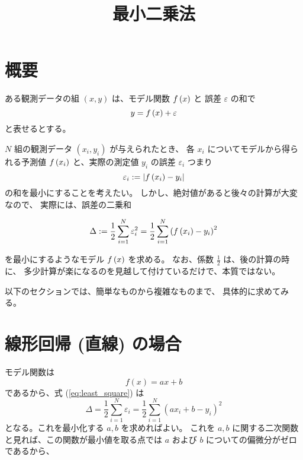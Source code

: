 \documentclass[12pt]{jsarticle}
\title{最小二乗法}
\def\error{\varepsilon}
\def\sumdata{\sum_{i=1}^{N}}
\begin{document}
\maketitle
\tableofcontents

\section{概要}
ある観測データの組 $(x, y)$ は、モデル関数 $f \left( x \right)$ と
誤差 $\varepsilon$ の和で
\begin{equation}
  y = \function{f}{x} + \error
\end{equation}
と表せるとする。

$N$ 組の観測データ $(x_i, y_i)$ が与えられたとき、
各 $x_i$ についてモデルから得られる予測値
$f \left( x_i \right)$ と、実際の測定値 $y_i$ の誤差 $\error_i$ つまり
\begin{equation}
  \error_i := \left| \function{f}{x_i} - y_i \right|
\end{equation}
の和を最小にすることを考えたい。
しかし、絶対値があると後々の計算が大変なので、
実際には、誤差の二乗和

\begin{equation}
  \Delta := \frac{1}{2} \sumdata \error_i^2 = \frac{1}{2} \sumdata
  \left( \function{f}{x_i} - y_i \right)^2 \label{eq:least_square}
\end{equation}

を最小にするようなモデル $f \left( x \right)$ を求める。
なお、係数 $\frac{1}{2}$ は、後の計算の時に、
多少計算が楽になるのを見越して付けているだけで、本質ではない。

以下のセクションでは、簡単なものから複雑なものまで、
具体的に求めてみる。

\section{線形回帰 (直線) の場合}

モデル関数は
\begin{equation}
  f \left( x \right) = a x + b
\end{equation}
であるから、式 (\ref{eq:least_square}) は
\begin{equation}
  \Delta = \frac{1}{2} \sumdata \error_i = \frac{1}{2}
  \sumdata \left( a x_i + b - y_i \right) ^2
\end{equation}
となる。これを最小化する $a, b$ を求めればよい。
これを $a, b$ に関する二次関数と見れば、この関数が最小値を取る点では
$a$ および $b$ についての偏微分がゼロであるから、
\end{document}

